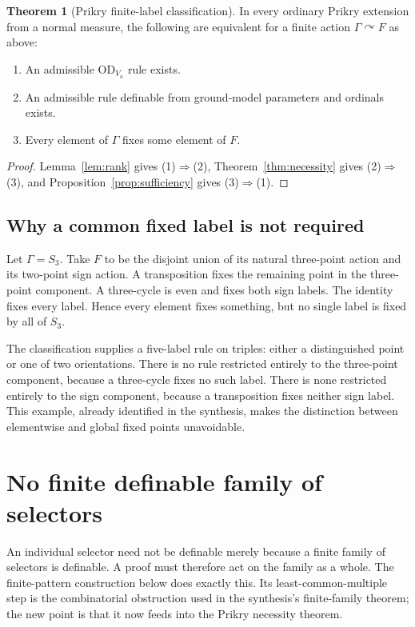 \documentclass[11pt,letterpaper]{article}
\theoremstyle{definition}
\newtheorem{theorem}[definition]{Theorem}
\numberwithin{equation}{section}
\newcommand{\OD}{\mathrm{OD}}
\newcommand{\acts}{\curvearrowright}
\begin{document}
\begin{theorem}[Prikry finite-label classification]\label{thm:classification}
In every ordinary Prikry extension from a normal measure, the following are equivalent for a finite action $\Gamma\acts F$ as above:
\begin{enumerate}
\item An admissible $\OD_{V_\kappa}$ rule exists.
\item An admissible rule definable from ground-model parameters and ordinals exists.
\item Every element of $\Gamma$ fixes some element of $F$.
\end{enumerate}
\end{theorem}
\begin{proof}
Lemma~\ref{lem:rank} gives (1)$\Rightarrow$(2), Theorem~\ref{thm:necessity} gives (2)$\Rightarrow$(3), and Proposition~\ref{prop:sufficiency} gives (3)$\Rightarrow$(1).
\end{proof}

\subsection{Why a common fixed label is not required}

Let $\Gamma=S_3$. Take $F$ to be the disjoint union of its natural three-point action and its two-point sign action. A transposition fixes the remaining point in the three-point component. A three-cycle is even and fixes both sign labels. The identity fixes every label. Hence every element fixes something, but no single label is fixed by all of $S_3$.

The classification supplies a five-label rule on triples: either a distinguished point or one of two orientations. There is no rule restricted entirely to the three-point component, because a three-cycle fixes no such label. There is none restricted entirely to the sign component, because a transposition fixes neither sign label. This example, already identified in the synthesis, makes the distinction between elementwise and global fixed points unavoidable.

\section{No finite definable family of selectors}\label{sec:selectors}

An individual selector need not be definable merely because a finite family of selectors is definable. A proof must therefore act on the family as a whole. The finite-pattern construction below does exactly this. Its least-common-multiple step is the combinatorial obstruction used in the synthesis's finite-family theorem; the new point is that it now feeds into the Prikry necessity theorem.
\end{document}
